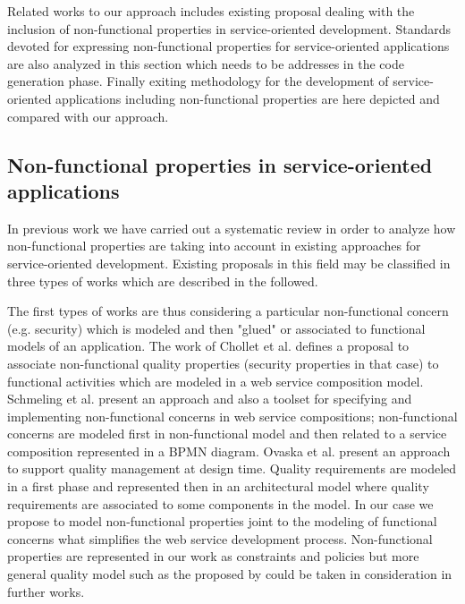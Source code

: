 
Related works to our approach includes existing proposal dealing with the inclusion of non-functional properties in service-oriented development. Standards devoted for expressing non-functional properties for service-oriented applications are also analyzed in this section which needs to be addresses in the code generation phase. Finally exiting methodology for the development of service-oriented applications including non-functional properties are here depicted and compared with our approach.

\subsection{Non-functional properties in service-oriented applications}

In previous work we have carried out a systematic review \cite{placidoPhDThesis2012} in order to analyze how non-functional properties are taking into account in existing approaches for service-oriented development. Existing proposals in this field may be classified in three types of works which are described in the followed.

The first types of works are thus considering a particular non-functional concern (e.g. security) which is modeled and then "glued" or associated to functional models of an application. The work of Chollet et al. \cite{CholletL09} defines a proposal to associate non-functional quality properties (security properties in that case) to functional activities which are modeled in a web service composition model.
Schmeling et al. \cite{SchmelingCM11} present an approach and also a toolset for specifying and implementing non-functional concerns in web service compositions; non-functional concerns are modeled first in non-functional model and then related to a service composition represented in a BPMN diagram. Ovaska et al. \cite{OvaskaEHPA10} present an approach to support quality management at design time. Quality requirements are modeled in a first phase and represented then in an architectural model where quality requirements are associated to some components in the model. In our case we propose to model non-functional properties joint to the modeling of functional concerns what simplifies the web service development process. Non-functional properties are represented in our work as constraints and policies but more general quality model such as the proposed by \cite{Goeb2011,Klass2009} could be taken in consideration in further works.

